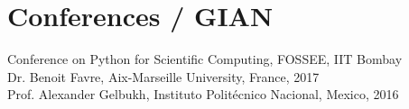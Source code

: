 \section{Conferences / GIAN}
Conference on Python for Scientific Computing, FOSSEE, IIT Bombay \\
Dr. Benoit Favre, Aix-Marseille University, France, 2017 \\
Prof. Alexander Gelbukh, Instituto Politécnico Nacional, Mexico, 2016
\sectionsep
